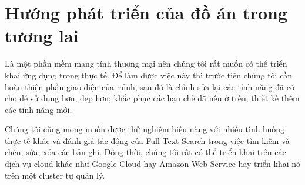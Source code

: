 
\section{Hướng phát triển của đồ án trong tương lai}
Là một phần mềm mang tính thương mại nên chúng tôi rất muốn có thể
triển khai ứng dụng trong thực tế. Để làm được việc này thì trước tiên
chúng tôi cần hoàn thiện phần giao diện của mình, sau đó là chỉnh sửa lại
các tính năng đã có cho dễ sử dụng hơn, đẹp hơn; khắc phục
các hạn chế đã nêu ở trên; thiết kế thêm các tính năng mới.

Chúng tôi cũng mong muốn được thử nghiệm hiệu năng với nhiều tình
huống thực tế khác và đánh giá tác động của Full Text Search
trong việc tìm kiếm và chèn, sửa, xóa các bản ghi. Đồng thời,
chúng tôi rất có thể triển khai trên các dịch vụ cloud khác như
Google Cloud hay Amazon Web Service hay triển khai nó trên
một cluster tự quản lý.
